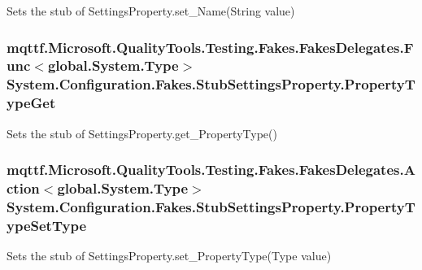 Sets the stub of Settings\-Property.\-set\-\_\-\-Name(\-String value)

\hypertarget{class_system_1_1_configuration_1_1_fakes_1_1_stub_settings_property_add1c0a440163ffcaf2b93d0cc9c6eefc}{
\subsubsection[{Property\-Type\-Get}]{\setlength{\rightskip}{0pt plus 5cm}mqttf.\-Microsoft.\-Quality\-Tools.\-Testing.\-Fakes.\-Fakes\-Delegates.\-Func$<$global.\-System.\-Type$>$ System.\-Configuration.\-Fakes.\-Stub\-Settings\-Property.\-Property\-Type\-Get}}\label{class_system_1_1_configuration_1_1_fakes_1_1_stub_settings_property_add1c0a440163ffcaf2b93d0cc9c6eefc}


Sets the stub of Settings\-Property.\-get\-\_\-\-Property\-Type()

\hypertarget{class_system_1_1_configuration_1_1_fakes_1_1_stub_settings_property_a3d6723886f97486f4d1c3d091d95906f}{
\subsubsection[{Property\-Type\-Set\-Type}]{\setlength{\rightskip}{0pt plus 5cm}mqttf.\-Microsoft.\-Quality\-Tools.\-Testing.\-Fakes.\-Fakes\-Delegates.\-Action$<$global.\-System.\-Type$>$ System.\-Configuration.\-Fakes.\-Stub\-Settings\-Property.\-Property\-Type\-Set\-Type}}\label{class_system_1_1_configuration_1_1_fakes_1_1_stub_settings_property_a3d6723886f97486f4d1c3d091d95906f}


Sets the stub of Settings\-Property.\-set\-\_\-\-Property\-Type(\-Type value)

